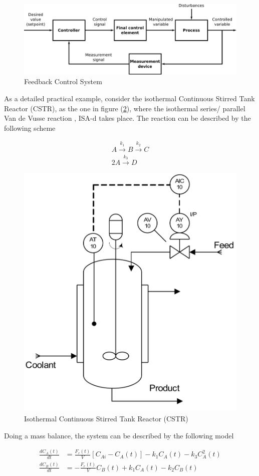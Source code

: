 \begin{figure}[htb!]
\centering
\includegraphics[width=0.9\linewidth]{../figuras/Ch2FeedbackControlSystem}
\caption{Feedback Control System} \label{Ch2fig:FeedbackControlSystem}
\end{figure}

As a detailed  practical example, consider the isothermal Continuous Stirred Tank Reactor (CSTR), as the one in figure (\ref{Ch2fig:CSTR}), where the isothermal series/ parallel Van de Vusse reaction \cite{arrietaETFA2008}, \cite{VandeVusse2} ISA-d takes place. The reaction can be described by the following scheme

\begin{align}
    A \overset{k_1}{\longrightarrow} B \overset{k_2}{\longrightarrow}C\\
    2 A \overset{k_3}{\longrightarrow} D \nonumber
\end{align}

\begin{figure}[htb!]
\centering
\includegraphics[width=0.5\linewidth]{../figuras/Ch2Reactor}
\caption{Isothermal Continuous Stirred Tank Reactor (CSTR)} 
\label{Ch2fig:CSTR}
\end{figure}

Doing a mass balance, the system can be described by the following model

\begin{align}
    \frac{dC_A(t)}{dt} & = \frac{F_r(t)}{V} \left[C_{Ai}-C_A(t)\right] - k_1 C_A(t) - k_3 C^2_A(t) \nonumber \\
    \frac{dC_B(t)}{dt} & = -\frac{F_r(t)}{V} C_B(t)+ k_1 C_A(t) - k_2 C_B(t)
    \label{Ch2eq:system3}
\end{align}

